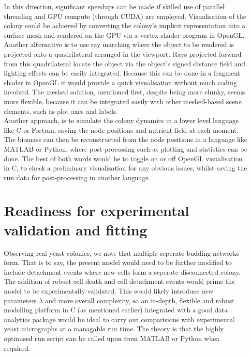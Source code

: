In this direction, significant speedups can be made if skilled use of 
parallel threading and GPU compute (through CUDA) are employed. Visualisation 
of the colony could be achieved by converting the colony's
implicit representation into a surface mesh and rendered on the GPU
via a vertex shader program in OpenGL. Another alternative 
is to use ray marching where the object to be rendered is projected 
onto a quadrilateral arranged in the viewport. Rays
projected forward from this quadrilateral locate the object via 
the object's signed distance field and lighting effects can
be easily integrated. Because 
this can be done in a fragment shader in OpenGL it 
would provide a quick visualisation without much 
coding involved. The meshed solution, mentioned first,
despite being more clunky, seems more flexible,
because it can be integrated easily with other meshed-based
scene elements, such as plot axes and labels.
\\

Another approach, is to simulate the colony dynamics in a lower 
level language like C or Fortran, saving the node positions and nutrient 
field at each moment. The biomass can then be reconstructed
from the node positions in a language like MATLAB or Python,
where post-processing such as plotting and statistics can be done.
The best of both words would be to toggle on or off 
OpenGL visualisation in C, to check a
preliminary visualisation for any obvious issues, whilst saving 
the run data for post-processing in another language.





\section{Readiness for experimental validation and fitting}\label{expFitting}
Observing real yeast colonies, we note that multiple
seperate budding networks form. That is to say,
the present model would need to be further modified 
to include detachment events where new cells form a 
seperate disconnected colony.
\\

The addition of robust cell death and cell detachment events would 
prime the model to be experimentally validated. This 
would likely introduce new parameters $\lambda$ and more 
overall complexity, so an in-depth, flexible and robust modelling platform 
in C (as mentioned earlier) integrated with a good data analytics package 
would be ideal to carry out comparisions with experimental yeast micrographs
at a managable run time. The theory is that the highly optimised run 
script can be called upon from MATLAB or Python when required.
\\

